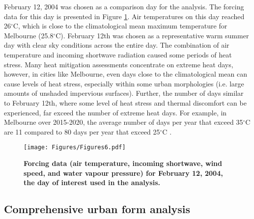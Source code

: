 \documentclass[final,3p,times,authoryear]{elsarticle}
\begin{document}
February 12, 2004 was chosen as a comparison day for the analysis. The forcing data for this day is presented in Figure \ref{fig:forcing}. Air temperatures on this day reached 26$^{\circ}$C, which is close to the climatological mean maximum temperature for Melbourne (25.8$^{\circ}$C). February 12th was chosen as a representative warm summer day with clear sky conditions across the entire day. The combination of air temperature and incoming shortwave radiation caused some periods of heat stress. Many heat mitigation assessments concentrate on extreme heat days, however, in cities like Melbourne, even days close to the climatological mean can cause levels of heat stress, especially within some urban morphologies (i.e. large amounts of unshaded impervious surfaces). Further, the number of days similar to February 12th, where some level of heat stress and thermal discomfort can be experienced, far exceed the number of extreme heat days. For example, in Melbourne over 2015-2020, the average number of days per year that exceed 35$^{\circ}$C are 11 compared to 80 days per year that exceed 25$^{\circ}$C \citep{BureauofMeteorology2021}.

\begin{figure}
\centering
\texttt{[image: Figures/Figures6.pdf]}
\caption{\bf Forcing data (air temperature, incoming shortwave, wind speed, and water vapour pressure) for February 12, 2004, the day of interest used in the analysis.}
 \label{fig:forcing}
\end{figure} 

\subsection{Comprehensive urban form analysis}\label{sec:methodsparam}

\end{document}
